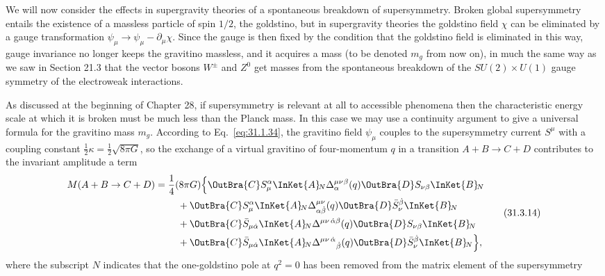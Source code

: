 We will now consider the effects in supergravity theories of a spontaneous
breakdown of supersymmetry. Broken global supersymmetry entails the
existence of a massless particle of spin \(1/2\), the goldstino, but in
supergravity theories the goldstino field \(\chi\) can be eliminated by a
gauge transformation
\(\psi_\mu\to\psi_\mu-\partial_\mu\chi\). Since the gauge is then fixed by
the condition that the goldstino field is eliminated in this way, gauge
invariance no longer keeps the gravitino massless, and it acquires a mass
(to be denoted \(m_g\) from now on), in much the same way as we saw in
Section 21.3 that the vector bosons \(W^\pm\) and \(Z^0\) get masses from
the spontaneous breakdown of the
\(SU(2)\times U(1)\) gauge symmetry of the electroweak interactions.

As discussed at the beginning of Chapter 28, if supersymmetry is relevant
at all to accessible phenomena then the characteristic energy scale at
which it is broken must be much less than the Planck mass. In this case we
may use a continuity argument to give a universal formula for the
gravitino mass \(m_g\). According to Eq.~\eqref{eq:31.1.34}, the gravitino
field \(\psi_\mu\) couples to the supersymmetry current \(S^\mu\) with a
coupling constant \(\frac12\kappa=\frac12\sqrt{8\pi G}\), so the exchange
of a virtual gravitino of four-momentum \(q\) in a transition
\(A+B\to C+D\) contributes to the invariant amplitude a term
\begin{equation}
  \begin{aligned}
  M(A+B\to C+D)
  ={}&\frac14(8\pi G)
  \Bigl\{
  \OutBra{C}S_\mu^\alpha\InKet{A}\!{}_{N}
    \Delta^{\mu\nu}_{\alpha}{}^\beta(q)
    \OutBra{D}S_{\nu\beta}\InKet{B}\!{}_{N}\\
  &\quad+
  \OutBra{C}S_\mu^\alpha\InKet{A}\!{}_{N}
    \Delta^{\mu\nu}_{\alpha\dot\beta}(q)
    \OutBra{D}\bar S_\nu^{\dot\beta}\InKet{B}\!{}_{N}\\
  &\quad+
  \OutBra{C}\bar S_{\mu\dot\alpha}\InKet{A}\!{}_{N}
    \Delta^{\mu\nu\,\dot\alpha\beta}(q)
    \OutBra{D}S_{\nu\beta}\InKet{B}\!{}_{N}\\
  &\quad+
  \OutBra{C}\bar S_{\mu\dot\alpha}\InKet{A}\!{}_{N}
    \Delta^{\mu\nu\,\dot\alpha}{}_{\dot\beta}(q)
    \OutBra{D}\bar S_\nu^{\dot\beta}\InKet{B}\!{}_{N}
  \Bigr\},
  \end{aligned}
  \tag{31.3.14}\label{eq:31.3.14}
\end{equation}
where the subscript \(N\) indicates that the one-goldstino pole at
\(q^2=0\) has been removed from the matrix element of the supersymmetry
